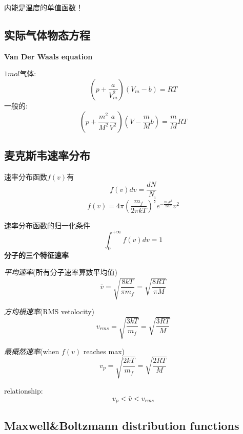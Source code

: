 \documentclass[10pt,a4paper]{article}
\begin{document}
内能是温度的单值函数！
\subsection{实际气体物态方程}
\textbf{Van Der Waals equation}

$1mol$气体:
\[(p+\frac{a}{V_m^2})(V_m-b)=RT\]
一般的:
\[(p+\frac{m^2}{M^2}\frac{a}{V^2})(V-\frac{m}{M}b)=\frac{m}{M}RT\]
\subsection{麦克斯韦速率分布}
速率分布函数$f(v)$有
\[\boxed{f(v)dv=\frac{dN}{N}}\]
\[f(v)=4\pi\left(\frac{m_f}{2\pi kT}\right)^{\frac{3}{2}}e^{-\frac{m_fv^2}{2kT}}v^2\]

速率分布函数的归一化条件
\[\int_0^{+\infty}f(v)dv=1\]
\textbf{分子的三个特征速率}

\textit{平均速率}(所有分子速率算数平均值)
\[\bar{v}=\sqrt{\frac{8kT}{\pi m_f}}=\sqrt{\frac{8RT}{\pi M}}\]

\textit{方均根速率}(RMS vetolocity)
\[v_{rms}=\sqrt{\frac{3kT}{m_f}}=\sqrt{\frac{3RT}{M}}\]

\textit{最概然速率}(when $f(v)$ reaches max)
\[v_{p}=\sqrt{\frac{2kT}{m_f}}=\sqrt{\frac{2RT}{M}}\]

relationship:
\[v_p<\bar{v}<v_{rms}\]
\subsection{Maxwell\&Boltzmann distribution functions}
\end{document}
